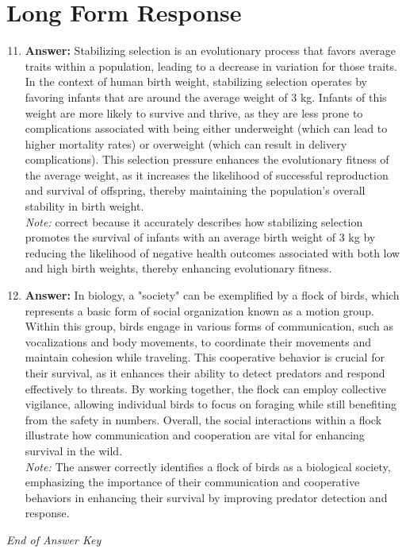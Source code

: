 \documentclass[12pt]{article}
\begin{document}
\section*{Long Form Response}
\begin{enumerate}[label=\arabic*.]
\setcounter{enumi}{10}
\item \textbf{Answer:} Stabilizing selection is an evolutionary process that favors average traits within a population, leading to a decrease in variation for those traits. In the context of human birth weight, stabilizing selection operates by favoring infants that are around the average weight of 3 kg. Infants of this weight are more likely to survive and thrive, as they are less prone to complications associated with being either underweight (which can lead to higher mortality rates) or overweight (which can result in delivery complications). This selection pressure enhances the evolutionary fitness of the average weight, as it increases the likelihood of successful reproduction and survival of offspring, thereby maintaining the population's overall stability in birth weight.
\\ \textit{Note:} correct because it accurately describes how stabilizing selection promotes the survival of infants with an average birth weight of 3 kg by reducing the likelihood of negative health outcomes associated with both low and high birth weights, thereby enhancing evolutionary fitness.
\item \textbf{Answer:} In biology, a "society" can be exemplified by a flock of birds, which represents a basic form of social organization known as a motion group. Within this group, birds engage in various forms of communication, such as vocalizations and body movements, to coordinate their movements and maintain cohesion while traveling. This cooperative behavior is crucial for their survival, as it enhances their ability to detect predators and respond effectively to threats. By working together, the flock can employ collective vigilance, allowing individual birds to focus on foraging while still benefiting from the safety in numbers. Overall, the social interactions within a flock illustrate how communication and cooperation are vital for enhancing survival in the wild.
\\ \textit{Note:} The answer correctly identifies a flock of birds as a biological society, emphasizing the importance of their communication and cooperative behaviors in enhancing their survival by improving predator detection and response.
\end{enumerate}

\vfill
\noindent\textit{End of Answer Key}
\end{document}
